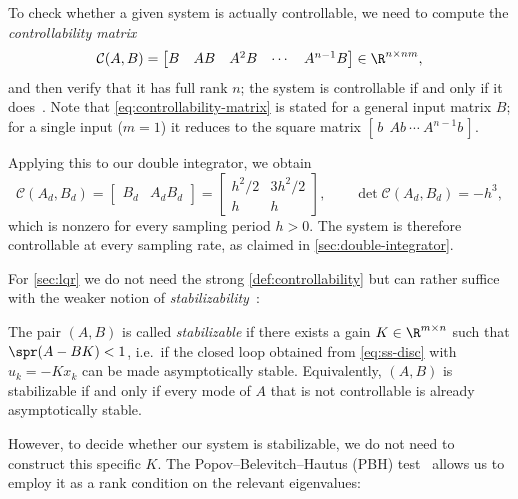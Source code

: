 To check whether a given system is actually controllable, we need to compute the
\emph{controllability matrix}~
\begin{equation}
    \label{eq:controllability-matrix}
    \mathcal{C}(A, B) =
    \begin{bmatrix} B & AB & A^{2}B & \cdots & A^{n-1}B \end{bmatrix}
    \in \R^{n \times nm},
\end{equation}
and then verify that it has full rank $n$; the system is controllable if and
only if it does~. Note that \eqref{eq:controllability-matrix} is stated for a general
input matrix $B$; for a single input ($m = 1$) it reduces to the square
matrix $[\,b\ \ Ab\ \cdots\ A^{n-1}b\,]$.

Applying this to our double integrator, we obtain
\begin{equation}
    \label{eq:di-controllability}
    \mathcal{C}(A_d, B_d) =
    \begin{bmatrix} B_d & A_d B_d \end{bmatrix}
    = \begin{bmatrix} h^{2}/2 & 3h^{2}/2 \\ h & h \end{bmatrix},
    \qquad
    \det \mathcal{C}(A_d, B_d) = -h^{3},
\end{equation}
which is nonzero for every sampling period $h > 0$. The system is therefore
controllable at every sampling rate, as claimed in
\cref{sec:double-integrator}.

For \cref{sec:lqr} we do not need the strong \cref{def:controllability}
but can rather suffice with the weaker notion of \emph{stabilizability}~:

\begin{definition}[Stabilizability]
\label{def:stabilizability}
The pair $(A, B)$ is called \emph{stabilizable} if there exists a gain
$K \in \R^{m \times n}$ such that $\spr(A - BK) < 1$, i.e.\ if the closed loop
obtained from \eqref{eq:ss-disc} with $u_k = -K x_k$ can be made asymptotically
stable. Equivalently, $(A,B)$ is stabilizable if and only if every mode of $A$
that is not controllable is already asymptotically stable.
\end{definition}

However, to decide whether our system is stabilizable,
we do not need to construct this specific $K$. The
Popov--Belevitch--Hautus (PBH) test~
allows us to employ it as a rank condition on the relevant eigenvalues:

